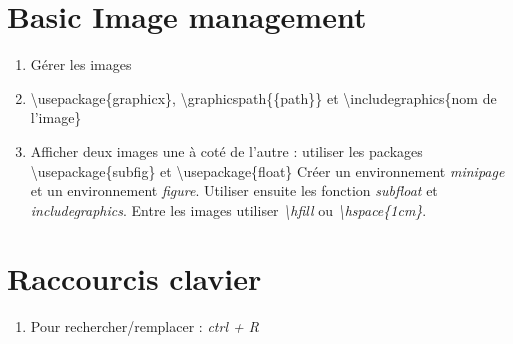 \documentclass[12pt, letterpaper]{article}
\begin{document}
\section{Basic Image management}
\begin{enumerate}
\item Gérer les images
\item \textbackslash usepackage\{graphicx\}, \textbackslash graphicspath\{\{path\}\} et \textbackslash includegraphics\{nom de l'image\}
\item Afficher deux images une à coté de l'autre : utiliser les packages \textbackslash usepackage\{subfig\} et \textbackslash usepackage\{float\}
\newline Créer un environnement \textit{minipage} et un environnement \textit{figure}. Utiliser ensuite les fonction \textit{subfloat} et \textit{includegraphics}. Entre les images utiliser \textit{\textbackslash hfill} ou \textit{\textbackslash hspace\{1cm\}}.
\end{enumerate}
\begin{minipage}{\linewidth}
  \begin{figure}[H]
  \centering
    \hspace{1cm}
  \end{figure}
\end{minipage}

\section{Raccourcis clavier}
\begin{enumerate}
\item Pour rechercher/remplacer : \textit{ctrl + R}
\end{enumerate}
\end{document}
